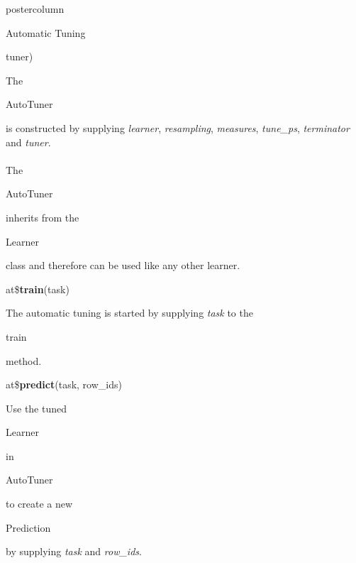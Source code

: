 \documentclass{beamer}
\newcommand{\codeinline}[1]{\begin{codeboxinline}#1\end{codeboxinline}}
\begin{document}
\begin{frame}[fragile]{}
\begin{columns}
\begin{column}{.245\textwidth}
\begin{beamercolorbox}[center]{postercolumn}
\begin{minipage}{.98\textwidth}
{\begin{myblock}{Automatic Tuning}
\begin{codeboxmultiline}[width=18cm]
								\hspace*{1ex}tuner)
							\end{codeboxmultiline}
							The \codeinline{AutoTuner} is constructed by supplying \textit{learner}, \textit{resampling}, \textit{measures}, \textit{tune\_ps}, \textit{terminator} and \textit{tuner}.
							\\
							\\
							The \codeinline{AutoTuner} inherits from the \codeinline{Learner} class and therefore can be used like any other learner.
							\\
							\begin{codebox}
								at\$\textbf{train}(task)
							\end{codebox}
							The automatic tuning is started by supplying \textit{task} to the \codeinline{train} method.
							\\
							\begin{codebox}
								at\$\textbf{predict}(task, row\_ids)
							\end{codebox}
							Use the tuned \codeinline{Learner} in \codeinline{AutoTuner} to create a new \codeinline{Prediction} by supplying \textit{task} and \textit{row\_ids}.
							\\
						\end{myblock}
						\vfill}
				\end{minipage}
			\end{beamercolorbox}
		\end{column}
	\end{columns}
\end{frame}
\end{document}
